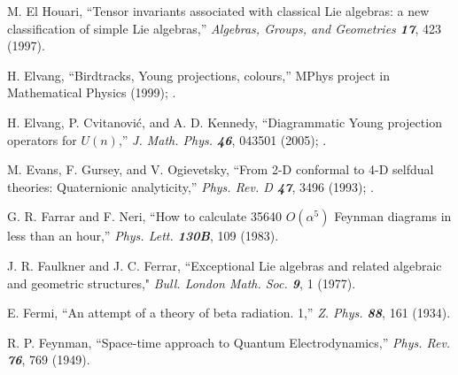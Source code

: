  M. El Houari,
    ``Tensor invariants associated with classical
      Lie algebras: a new classification of simple Lie algebras,''
    {\em Algebras, Groups, and Geometries \bf 17}, 423 (1997).

 H. Elvang,
    ``Birdtracks, Young projections, colours,''
     MPhys project in Mathematical Physics (1999);
  .

 H. Elvang, P. Cvitanovi\'c, and A. D. Kennedy,
    ``Diagrammatic Young projection operators for $U(n)$,''
        {\em J. Math. Phys. \bf 46}, 043501 (2005);
    .

M. Evans, F. Gursey, and V. Ogievetsky,
``From 2-D conformal to 4-D selfdual theories: Quaternionic analyticity,''
{\em Phys.  Rev.    D \bf 47}, 3496 (1993);
.



G. R. Farrar and F. Neri,
``How to calculate 35640 $O(\alpha^5)$ Feynman diagrams in less than an
hour,''
{\em Phys.  Lett.    \bf 130B}, 109 (1983).


 J. R. Faulkner and J. C. Ferrar,
    ``Exceptional Lie algebras
    and related algebraic and geometric structures,"
    {\em Bull. London Math. Soc.  \bf 9}, 1 (1977).

 E. Fermi,
``An attempt of a theory of beta radiation. 1,''
{\em Z.  Phys.    \bf 88}, 161 (1934).



 R. P. Feynman,
``Space-time approach to {Quantum Electrodynamics},''
{\em Phys. Rev. \bf 76}, 769 (1949). %

